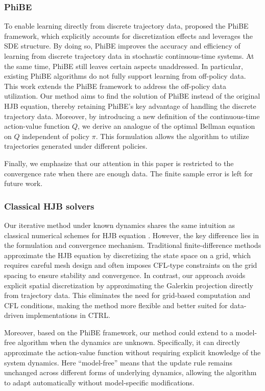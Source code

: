 \documentclass[12pt]{article}
\begin{document}
\subsubsection{PhiBE}
To enable learning directly from discrete trajectory data, \citep{zhu2024phibe} proposed the PhiBE framework, which explicitly accounts for discretization effects and leverages the SDE structure. By doing so, PhiBE improves the accuracy and efficiency of learning from discrete trajectory data in stochastic continuous-time systems. At the same time, PhiBE still leaves certain aspects unaddressed. In particular, existing PhiBE algorithms do not fully support learning from off-policy data. This work extends the PhiBE framework to address the off-policy data utilization. Our method aims to find the solution of PhiBE instead of the original HJB equation, thereby retaining PhiBE's key advantage of handling the discrete trajectory data. Moreover, by introducing a new definition of the continuous-time action-value function $Q$, we derive an analogue of the optimal Bellman equation on $Q$ independent of policy $\pi$. This formulation allows the algorithm to utilize trajectories generated under different policies. 

Finally, we emphasize that our attention in this paper is restricted to the convergence rate when there are enough data. The finite sample error \citep{zhao2025sample,muehlebach2025sample,zhu2024phibe} is left for future work.

\subsubsection{Classical HJB solvers}


Our iterative method under known dynamics shares the same intuition as classical numerical schemes for HJB equation \citep{schaeffer2016accelerated, feng2013recent}. However, the key difference lies in the formulation and convergence mechanism. Traditional finite-difference methods approximate the HJB equation by discretizing the state space on a grid, which requires careful mesh design and often imposes CFL-type constraints on the grid spacing to ensure stability and convergence. In contrast, our approach avoids explicit spatial discretization by approximating the Galerkin projection directly from trajectory data. This eliminates the need for grid-based computation and CFL conditions, making the method more flexible and better suited for data-driven implementations in CTRL.

Moreover, based on the PhiBE framework, our method could extend to a model-free algorithm when the dynamics are unknown. Specifically, it can directly approximate the action-value function without requiring explicit knowledge of the system dynamics. Here “model-free” means that the update rule remains unchanged across different forms of underlying dynamics, allowing the algorithm to adapt automatically without model-specific modifications.
\end{document}
